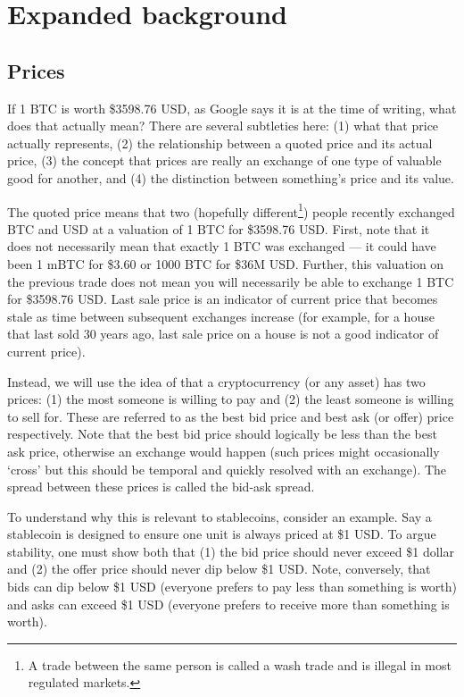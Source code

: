 
\clearpage
\appendix

\section{Expanded background}

\subsection{Prices}

If 1 BTC is worth \$3598.76 USD, as Google says it is at the time of writing, what does that actually mean? There are several subtleties here: (1) what that price actually represents, (2) the relationship between a quoted price and its actual price, (3) the concept that prices are really an exchange of one type of valuable good for another, and (4) the distinction between something's price and its value. 

The quoted price means that two (hopefully different\footnote{A trade between the same person is called a wash trade and is illegal in most regulated markets.}) people recently exchanged BTC and USD at a valuation of 1 BTC for \$3598.76 USD. First, note that it does not necessarily mean that exactly 1 BTC was exchanged --- it could have been 1 mBTC for \$3.60 or 1000 BTC for \$36M USD. Further, this valuation on the previous trade does not mean you will necessarily be able to exchange 1 BTC for \$3598.76 USD. Last sale price is an indicator of current price that becomes stale as time between subsequent exchanges increase (for example, for a house that last sold 30 years ago, last sale price on a house is not a good indicator of current price).

Instead, we will use the idea of that a cryptocurrency (or any asset) has two prices: (1) the most someone is willing to pay and (2) the least someone is willing to sell for. These are referred to as the best bid price and best ask (or offer) price respectively. Note that the best bid price should logically be less than the best ask price, otherwise an exchange would happen (such prices might occasionally `cross' but this should be temporal and quickly resolved with an exchange). The spread between these prices is called the bid-ask spread.

To understand why this is relevant to stablecoins, consider an example. Say a stablecoin is designed to ensure one unit is always priced at \$1 USD. To argue stability, one must show both that (1) the bid price should never exceed \$1 dollar and (2) the offer price should never dip below \$1 USD. Note, conversely, that bids can dip below \$1 USD (everyone prefers to pay less than something is worth) and asks can exceed \$1 USD (everyone prefers to receive more than something is worth).

